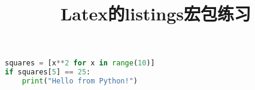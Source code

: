 \documentclass[UTF8]{article}
\title{Latex的listings宏包练习}
\begin{document}
\maketitle



\begin{lstlisting}[language=Python, caption=一个Python示例] 
squares = [x**2 for x in range(10)]
if squares[5] == 25:
    print("Hello from Python!")
\end{lstlisting}
\end{document}

